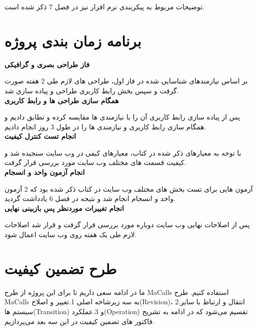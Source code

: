 \documentclass[a4paper, 12pt]{report}
\begin{document}
	توضیحات مربوط به پیکربندی نرم افزار نیز در فصل 7 ذکر شده است.
		
	
	\chapter{برنامه زمان بندی پروژه}	
	
	\noindent\textbf{فاز طراحی بصری و گرافیکی}
	
	بر اساس نیازمندهای شناسایی شده در فاز اول، طراحی های لازم طی 2 هفته صورت گرفت و سپس بخش رابط کاربری طراحی و پیاده سازی شد.\\	
	
	\noindent\textbf{همگام سازی طراحی ها و رابط کاربری}
	
	پس از پیاده سازی رابط کاربری آن را با نیازمندی ها مقایسه کرده و تطابق دادیم و همگام سازی رابط کاربری و نیازمندی ها را در طول 3 روز انجام دادیم.\\
	
	\noindent\textbf{انجام تست کنترل کیفیت}
	
	با توجه به معیارهای ذکر شده در کتاب، معیارهای کیفی در وب سایت سنجیده شد و کیفیت قسمت های مختلف وب سایت مورد بررسی قرار گرفت.\\
	
	\noindent\textbf{انجام آزمون واحد و انسجام}
	
	آزمون هایی برای تست بخش های مختلف وب سایت در کتاب ذکر شده بود که 2 آزمون واحد و انسجام انجام شد و نتیجه در فصل 6 یادداشت گردید.\\
	
	
	\noindent\textbf{انجام تغییرات موردنظر پس بازبینی نهایی}
	
	پس از اصلاحات نهایی وب سایت دوباره مورد بررسی قرار گرفت و قرار شد اصلاحات لازم طی یک هفته روی وب سایت اعمال شود.
		

	\chapter{طرح تضمین کیفیت}	
	
	ما در ادامه سعی داریم تا برای این پروژه از طرح MaCalls استفاده کنیم.
	طرح MaCalls به سه زیرشاخه اصلی 1.تغییر و اصلاح(Revision)، 2.انتقال و ارتباط با سایر سیستم ها(Transition) و 3.عملکرد(Operation) تقسیم می‌شود که در ادامه به تشریح فاکتور های تضمین کیفیت در این سه بعد می‌پردازیم.\\
	
\end{document}
